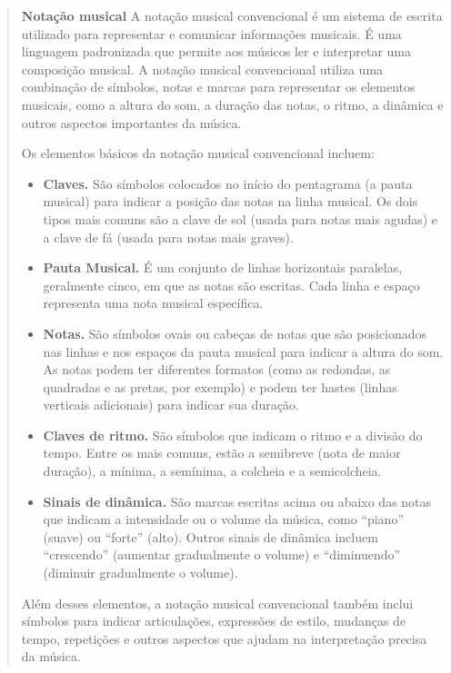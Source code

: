 \begin{quote}
\textbf{Notação musical}
A notação musical convencional é um sistema de escrita utilizado para representar e comunicar informações 
musicais. É uma linguagem padronizada que permite aos músicos ler e interpretar uma composição musical.
A notação musical convencional utiliza uma combinação de símbolos, notas e marcas para representar os 
elementos musicais, como a altura do som, a duração das notas, o ritmo, a dinâmica e outros aspectos 
importantes da música.

Os elementos básicos da notação musical convencional incluem:

\begin{itemize}
  \item \textbf{Claves.} São símbolos colocados no início do pentagrama (a pauta musical) para indicar a 
  posição das notas na linha musical. Os dois tipos mais comuns são a clave de sol (usada para notas mais 
  agudas) e a clave de fá (usada para notas mais graves).
  \item \textbf{Pauta Musical.} É um conjunto de linhas horizontais paralelas, geralmente cinco, em que as 
  notas são escritas. Cada linha e espaço representa uma nota musical específica.
  \item \textbf{Notas.} São símbolos ovais ou cabeças de notas que são posicionados nas linhas e nos 
  espaços da pauta musical para indicar a altura do som. As notas podem ter diferentes formatos (como as 
  redondas, as quadradas e as pretas, por exemplo) e podem ter hastes (linhas verticais adicionais) para indicar sua duração.
  \item \textbf{Claves de ritmo.} São símbolos que indicam o ritmo e a divisão do tempo. Entre os mais 
  comuns, estão a semibreve (nota de maior duração), a mínima, a semínima, a colcheia e a semicolcheia.
  \item \textbf{Sinais de dinâmica.} São marcas escritas acima ou abaixo das notas que indicam a 
  intensidade ou o volume da música, como ``piano'' (suave) ou ``forte'' (alto). Outros sinais de dinâmica 
  incluem ``crescendo'' (aumentar gradualmente o volume) e ``diminuendo'' (diminuir gradualmente o volume).
\end{itemize}

Além desses elementos, a notação musical convencional também inclui símbolos para indicar articulações, expressões de estilo, mudanças de tempo, repetições e outros aspectos que ajudam na interpretação precisa da música.

\end{quote}

